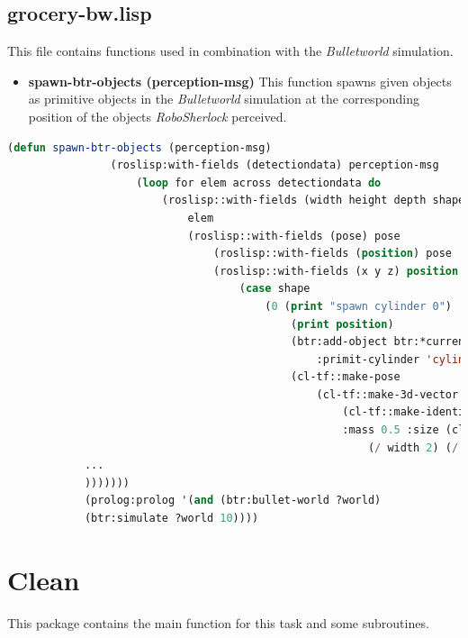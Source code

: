 \documentclass[main.tex]{subfiles}
\begin{document}
		\subsection{grocery-bw.lisp}
		This file contains functions used in combination with the \textit{Bulletworld} simulation.
		\begin{itemize}
			\item \textbf{spawn-btr-objects (perception-msg)}
			This function spawns given objects as primitive objects in the \textit{Bulletworld} simulation at the corresponding position of the objects \textit{RoboSherlock} perceived.  
		\end{itemize}
		\begin{lstlisting}[language=lisp]
			(defun spawn-btr-objects (perception-msg)
				(roslisp:with-fields (detectiondata) perception-msg
					(loop for elem across detectiondata do
						(roslisp::with-fields (width height depth shape pose) 
							elem
							(roslisp::with-fields (pose) pose
								(roslisp::with-fields (position) pose
								(roslisp::with-fields (x y z) position 
									(case shape
										(0 (print "spawn cylinder 0")
											(print position)
											(btr:add-object btr:*current-bullet-world* 
												:primit-cylinder 'cylinder-0 
											(cl-tf::make-pose 
												(cl-tf::make-3d-vector x y z)
													(cl-tf::make-identity-rotation))
													:mass 0.5 :size (cl-tf:make-3d-vector 
														(/ width 2) (/ depth 2) (/ height 2))))
			...
			)))))))
			(prolog:prolog '(and (btr:bullet-world ?world)
			(btr:simulate ?world 10))))
		\end{lstlisting}
	  	\section{Clean}
	  	\label{clean}
	  	This package contains the main function for this task and some subroutines.
\end{document}
